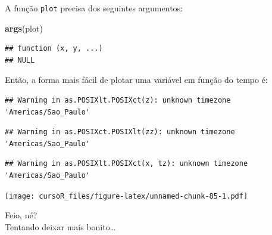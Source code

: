 \documentclass[]{book}
\newenvironment{Shaded}{\begin{snugshade}}{\end{snugshade}}
\newcommand{\KeywordTok}[1]{\textcolor[rgb]{0.13,0.29,0.53}{\textbf{#1}}}
\newcommand{\DataTypeTok}[1]{\textcolor[rgb]{0.13,0.29,0.53}{#1}}
\newcommand{\DecValTok}[1]{\textcolor[rgb]{0.00,0.00,0.81}{#1}}
\newcommand{\StringTok}[1]{\textcolor[rgb]{0.31,0.60,0.02}{#1}}
\newcommand{\CommentTok}[1]{\textcolor[rgb]{0.56,0.35,0.01}{\textit{#1}}}
\newcommand{\OperatorTok}[1]{\textcolor[rgb]{0.81,0.36,0.00}{\textbf{#1}}}
\newcommand{\NormalTok}[1]{#1}
\theoremstyle{definition}
\theoremstyle{definition}
\theoremstyle{definition}
\theoremstyle{remark}
\begin{document}
A função \texttt{plot} precisa dos seguintes argumentos:

\begin{Shaded}
\begin{Highlighting}[]
\KeywordTok{args}\NormalTok{(plot)}
\end{Highlighting}
\end{Shaded}

\begin{verbatim}
## function (x, y, ...) 
## NULL
\end{verbatim}

Então, a forma mais fácil de plotar uma variável em função do tempo é:

\begin{Shaded}
\end{Shaded}

\begin{verbatim}
## Warning in as.POSIXlt.POSIXct(z): unknown timezone 'Americas/Sao_Paulo'
\end{verbatim}

\begin{verbatim}
## Warning in as.POSIXct.POSIXlt(zz): unknown timezone 'Americas/Sao_Paulo'
\end{verbatim}

\begin{verbatim}
## Warning in as.POSIXlt.POSIXct(x, tz): unknown timezone 'Americas/Sao_Paulo'
\end{verbatim}

\texttt{[image: cursoR\_files/figure-latex/unnamed-chunk-85-1.pdf]}

Feio, né?\\
Tentando deixar mais bonito\ldots{}

\begin{Shaded}
\end{Shaded}
\end{document}
